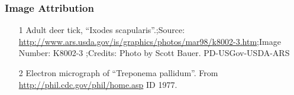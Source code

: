 \documentclass[usenames,dvipsnames,15pt]{beamer}
\newcommand{\backupend}{
   \setcounter{framenumber}{\value{finalframe}}
}
\begin{document}
\begin{frame}
  \frametitle{Image Attribution}
  \begin{enumerate}
  \item [1] Adult deer tick, ``Ixodes scapularis''.;Source: \url{http://www.ars.usda.gov/is/graphics/photos/mar98/k8002-3.htm};Image Number: K8002-3 ;Credits: Photo by Scott Bauer. PD-USGov-USDA-ARS
  \item [2] Electron micrograph of ``Treponema pallidum''. From \url{http://phil.cdc.gov/phil/home.asp} ID 1977. 
  \end{enumerate}
\end{frame}

\begin{frame}[allowframebreaks]

\end{frame}

\backupend
\end{document}
